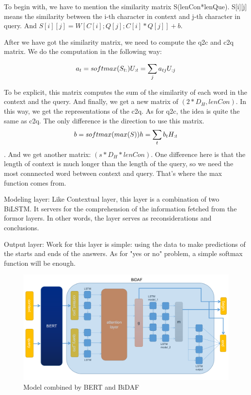 \documentclass{article}
\begin{document}
To begin with, we have to mention the similarity matrix S(lenCon*lenQue). S[i][j] means the similarity between the i-th character in context and j-th character in query. And $S[i][j]=W[C[i];Q[j];C[i]*Q[j]]+b$.

After we have got the similarity matrix, we need to compute the q2c and c2q matrix. We do the computation in the following way:

$$a_t=softmax(S_{t:})\\U_{:t}=\sum_{j}a_{tj}U_{:j}$$ 
 
To be explicit, this matrix computes the sum of the similarity of each word in the context and the query. And finally, we get a new matrix of $( 2*D_H , lenCon )$. In this way, we get the representations of the c2q. 
As for q2c, the idea is quite the same as c2q. The only difference is the direction to use this matrix. $$b=softmax(max(S))\\h=\sum_tb_tH_{:t}$$. And we get another matrix: $(s*D_H* lenCon)$. One difference here is that the length of context is much longer than the length of the query, so we need the most connnected word between context and query. That's where the max function comes from.

Modeling layer: Like Contextual layer, this layer is a combination of two BiLSTM. It servers for the comprehension of the information fetched from the formor layers. In other words, the layer serves as reconsiderations and conclusions. 

Output layer: Work for this layer is simple: using the data to make predictions of the starts and ends of the answers. As for "yes or no" problem, a simple softmax function will be enough. 

\begin{figure}[h]
	\centering
	\includegraphics[scale=0.25 ]{Model.png}
	\caption{Model combined by BERT and BiDAF}
\end{figure}
\end{document}

